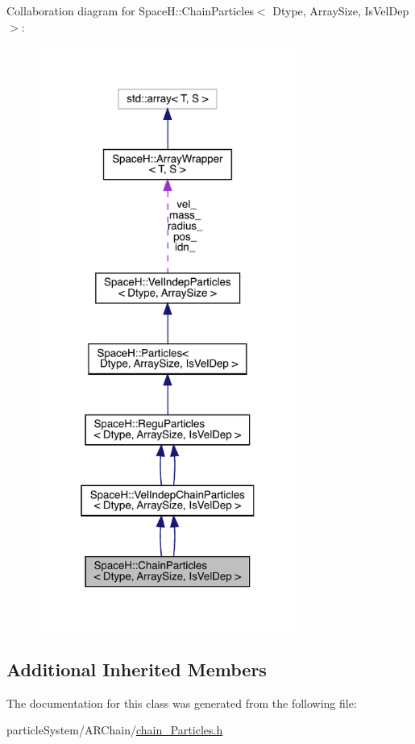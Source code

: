 Collaboration diagram for SpaceH\+:\+:Chain\+Particles$<$ Dtype, Array\+Size, Is\+Vel\+Dep $>$\+:
\nopagebreak
\begin{figure}[H]
\begin{center}
\leavevmode
\includegraphics[width=241pt]{class_space_h_1_1_chain_particles__coll__graph}
\end{center}
\end{figure}
\subsection*{Additional Inherited Members}


The documentation for this class was generated from the following file\+:\begin{DoxyCompactItemize}
\item 
particle\+System/\+A\+R\+Chain/\mbox{\hyperlink{chain_particles_8h}{chain_\+Particles.\+h}}\end{DoxyCompactItemize}

